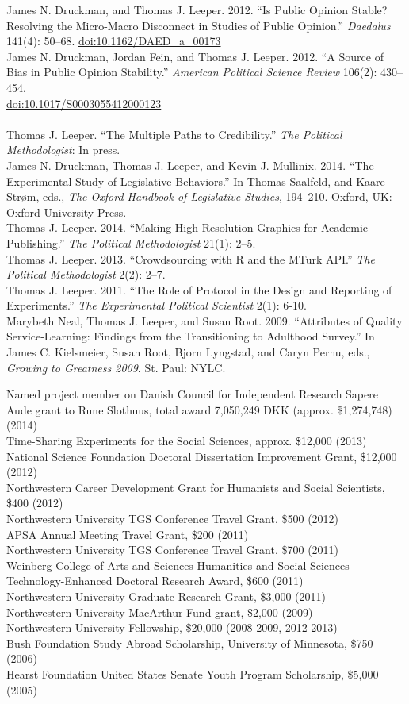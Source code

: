 \documentclass[12pt]{article}
\renewcommand{\section}[1]{\pagebreak[3]%
    \llap{\scshape\smash{\parbox[t]{\marginparwidth}{\raggedright {\color{lg}#1}}}}%
    \vspace{-\baselineskip}\par}
\newcommand{\topic}[1]{\pagebreak[3]\indent {\color{lg}{\footnotesize #1 }}\\}
\newcommand{\entry}[1]{\indent {\color{lg}\guillemotright}\hspace{2pt}#1\vspace{.25em}\\}
\begin{document}
\entry{James N. Druckman, and Thomas J. Leeper. 2012. ``Is Public Opinion Stable? Resolving the Micro-Macro Disconnect in Studies of Public Opinion.'' {\em Daedalus} 141(4): 50--68. \href{http://dx.doi.org/10.1162/DAED\_a\_00173}{doi:10.1162/DAED\_a\_00173}}
\entry{James N. Druckman, Jordan Fein, and Thomas J. Leeper. 2012. ``A Source of Bias in Public Opinion Stability.'' {\em American Political Science Review} 106(2): 430--454.\\ \href{http://dx.doi.org/10.1017/S0003055412000123}{doi:10.1017/S0003055412000123}}

\topic{Other Publications}
\entry{Thomas J. Leeper. ``The Multiple Paths to Credibility.'' {\em The Political Methodologist}: In press.}
\entry{James N. Druckman, Thomas J. Leeper, and Kevin J. Mullinix. 2014. ``The Experimental Study of Legislative Behaviors.'' In Thomas Saalfeld, and Kaare Str\o m, eds., {\em The Oxford Handbook of Legislative Studies}, 194--210. Oxford, UK: Oxford University Press.}
\entry{Thomas J. Leeper. 2014. ``Making High-Resolution Graphics for Academic Publishing.'' {\em The Political Methodologist} 21(1): 2--5.}
\entry{Thomas J. Leeper. 2013. ``Crowdsourcing with R and the MTurk API.'' {\em The Political Methodologist} 2(2): 2--7.}
\entry{Thomas J. Leeper. 2011. ``The Role of Protocol in the Design and Reporting of Experiments.'' {\em The Experimental Political Scientist} 2(1): 6-10.}%
\entry{Marybeth Neal, Thomas J. Leeper, and Susan Root. 2009. ``Attributes of Quality Service-Learning: Findings from the Transitioning to Adulthood Survey.'' In James C. Kielsmeier, Susan Root, Bjorn Lyngstad, and Caryn Pernu, eds., {\em Growing to Greatness 2009}. St. Paul: NYLC.}


\section{Grants\\and\\Funding}
\entry{Named project member on Danish Council for Independent Research Sapere Aude grant to Rune Slothuus, total award 7,050,249 DKK (approx. \$1,274,748) (2014)}
\entry{Time-Sharing Experiments for the Social Sciences, approx. \$12,000 (2013)}
\entry{National Science Foundation Doctoral Dissertation Improvement Grant, \$12,000 (2012)}
\entry{Northwestern Career Development Grant for Humanists and Social Scientists, \$400 (2012)}
\entry{Northwestern University TGS Conference Travel Grant, \$500 (2012)}
\entry{APSA Annual Meeting Travel Grant, \$200 (2011)}
\entry{Northwestern University TGS Conference Travel Grant, \$700 (2011)}
\entry{Weinberg College of Arts and Sciences Humanities and Social Sciences Technology-Enhanced Doctoral Research Award, \$600 (2011)}
\entry{Northwestern University Graduate Research Grant, \$3,000 (2011)}
\entry{Northwestern University MacArthur Fund grant, \$2,000 (2009)}
\entry{Northwestern University Fellowship, \$20,000 (2008-2009, 2012-2013)}
\entry{Bush Foundation Study Abroad Scholarship, University of Minnesota, \$750 (2006)}
\entry{Hearst Foundation United States Senate Youth Program Scholarship, \$5,000 (2005)}
\end{document}
